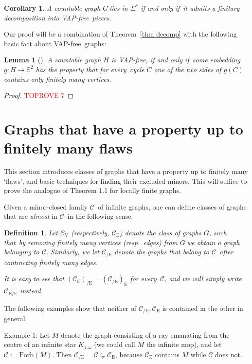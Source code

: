 \documentclass{article}
\newcommand{\forb}[1]{\mathrm{Forb}(#1)}
\newcommand{\rmv}[1]{\ensuremath{#1_{\mathrm{V}}}}
\newcommand{\rme}[1]{\ensuremath{#1_{\mathrm{E}}}}
\newcommand{\rmce}[1]{\ensuremath{#1_{\mathrm{/E}}}}
\newcommand{\rmece}[1]{\ensuremath{#1_{\mathrm{E/E}}}}
\newcommand{\Sig}{\ensuremath{\Sigma}}
\newcommand{\vapf}{VAP-free}
\newcommand{\defi}[1]{{\color{darkgray}\emph{#1}}}
\newtheorem{definition}[proposition]{Definition}
\newtheorem{corollary}[proposition]{Corollary}
\newtheorem{lemma}[proposition]{Lemma}
\newcommand{\BS}{\ensuremath{\mathbb S}}
\newcommand{\cc}{\ensuremath{\mathcal C}}
\newcommand{\g}{\ensuremath{G\ }}
\newcommand{\G}{\ensuremath{G}}
\newcommand{\Tr}[1]{Theorem~\ref{#1}}
\renewcommand{\iff}{if and only if}
\newcommand{\fe}{for every}
\newcommand{\st}{such that}
\begin{document}
\begin{corollary}\label{cor vapf}
A countable graph \g lies in $\Sig^*$ \iff\ it admits a finitary decomposition into \vapf\ pieces.
\end{corollary}

Our proof will be a combination of \Tr{thm decomp} with the following basic fact about \vapf\ graphs:
\begin{lemma}[{\cite[LEMMA~7.1]{thoPla}}] \label{lem vapf}
A countable graph $H$ is \vapf,  \iff\ some embedding $g: H\to \BS^2$ has the property that \fe\ cycle $C$ one of the two sides of $g(C)$ contains only finitely many vertices.
\end{lemma}


\begin{proof}\textcolor{red}{TOPROVE 7}\end{proof}


\section{Graphs that have a property up to finitely many flaws} \label{sec AF} 

This section introduces classes of graphs that have a property up to finitely many `flaws', and basic techniques for finding their excluded minors. This will suffice to prove the analogue of Theorem 1.1 for locally finite graphs.

Given a minor-closed family \cc\ of infinite graphs, one can define classes of graphs that are \defi{almost} in \cc\ in the following sense. 

\begin{definition} \label{def almost} Let \defi{\rmv{\cc}} (respectively, \defi{\rme{\cc}}) denote the class of graphs \G, \st\ by removing finitely many vertices (resp.\ edges) from \g we obtain a graph belonging to \cc. Similarly, we let  \defi{\rmce{\cc}} denote the graphs that belong to \cc\ after contracting finitely many edges. 

It is easy to see that $\rmce{(\rme{\cc})} = \rme{(\rmce{\cc})}$ \fe\ \cc, and we will simply write $\rmece{\cc}$ instead.
\end{definition}

The following examples show that neither of $\cc_{\mathrm{/E}},\cc_\mathrm{E}$ is contained in the other in general. 

Example 1: Let $M$ denote the graph consisting of a ray emanating from the centre of an infinite star $K_{1,\omega}$ (we could call $M$ the infinite mop), and let $\cc:= \forb{M}$. Then $\cc_{\mathrm{/E}}=\cc \subsetneq \cc_\mathrm{E}$, because $\cc_\mathrm{E}$ contains $M$ while $\cc$ does not. 
\end{document}
